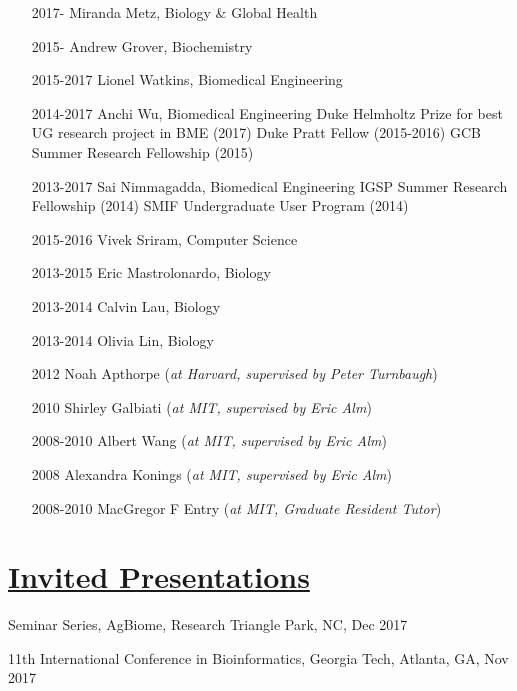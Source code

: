 \documentclass[overlapped,line,11pt]{res}
\begin{document}
\begin{resume}
\begin{itemize}[leftmargin=2cm, style=sameline, itemsep=0mm]
\item[2017-] Miranda Metz, Biology \& Global Health 
\item[2015-] Andrew Grover, Biochemistry 
\item[2015-2017] Lionel Watkins, Biomedical Engineering 
\item[2014-2017] Anchi Wu, Biomedical Engineering \newline 
  Duke Helmholtz Prize for best UG research project in BME (2017) \newline
  Duke Pratt Fellow (2015-2016) \newline
  GCB Summer Research Fellowship (2015) 
\item[2013-2017] Sai Nimmagadda, Biomedical Engineering \newline
  IGSP Summer Research Fellowship (2014) \newline
  SMIF Undergraduate User Program (2014)
\item[2015-2016] Vivek Sriram, Computer Science
\item[2013-2015] Eric Mastrolonardo, 
  Biology 
\item[2013-2014] Calvin Lau, Biology 
\item[2013-2014] Olivia Lin, Biology
\item[2012] Noah Apthorpe (\emph{at Harvard, supervised by Peter Turnbaugh})
\item[2010] Shirley Galbiati (\emph{at MIT, supervised by Eric Alm})
\item[2008-2010] Albert Wang (\emph{at MIT, supervised by Eric Alm})
\item[2008] Alexandra Konings (\emph{at MIT, supervised by Eric Alm})
\item[2008-2010] MacGregor F Entry (\emph{at MIT, Graduate Resident Tutor})
\end{itemize}

\section{\underline{\sc Invited Presentations}}
\vspace{.25in}

\begin{revnumerate}[58]

\item {Seminar Series, AgBiome, Research Triangle Park, NC, Dec 2017}

\item {11th International Conference in Bioinformatics, Georgia Tech, Atlanta, GA, Nov 2017}


\end{revnumerate}
\end{resume}
\end{document}

